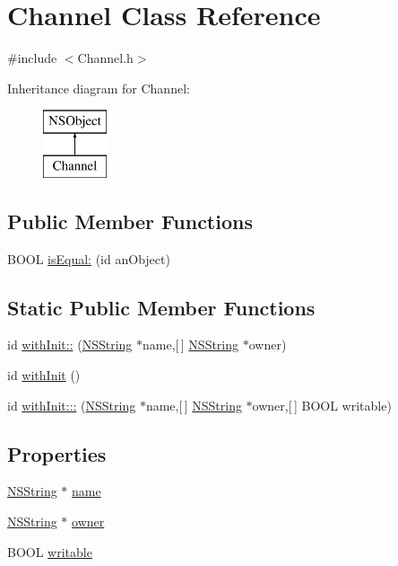 \hypertarget{interface_channel}{
\section{\-Channel \-Class \-Reference}
\label{interface_channel}
}


{\ttfamily \#include $<$\-Channel.\-h$>$}

\-Inheritance diagram for \-Channel\-:\begin{figure}[H]
\begin{center}
\leavevmode
\includegraphics[height=2.000000cm]{interface_channel}
\end{center}
\end{figure}
\subsection*{\-Public \-Member \-Functions}
\begin{DoxyCompactItemize}
\item 
\-B\-O\-O\-L \hyperlink{interface_channel_ad8953282a8deae8579e0f293429424e9}{is\-Equal\-:} (id an\-Object)
\end{DoxyCompactItemize}
\subsection*{\-Static \-Public \-Member \-Functions}
\begin{DoxyCompactItemize}
\item 
id \hyperlink{interface_channel_abe225600e78759a3765c5a5af891b4ca}{with\-Init\-::} (\hyperlink{class_n_s_string}{\-N\-S\-String} $\ast$name,\mbox{[}$\,$\mbox{]} \hyperlink{class_n_s_string}{\-N\-S\-String} $\ast$owner)
\item 
id \hyperlink{interface_channel_a0aab206e239acdec6d50bd8e328934ba}{with\-Init} ()
\item 
id \hyperlink{interface_channel_a8c36d05ce985b19155c3a873a0c1ba43}{with\-Init\-:::} (\hyperlink{class_n_s_string}{\-N\-S\-String} $\ast$name,\mbox{[}$\,$\mbox{]} \hyperlink{class_n_s_string}{\-N\-S\-String} $\ast$owner,\mbox{[}$\,$\mbox{]} \-B\-O\-O\-L writable)
\end{DoxyCompactItemize}
\subsection*{\-Properties}
\begin{DoxyCompactItemize}
\item 
\hyperlink{class_n_s_string}{\-N\-S\-String} $\ast$ \hyperlink{interface_channel_a10427d10e009025674146f604b6edb35}{name}
\item 
\hyperlink{class_n_s_string}{\-N\-S\-String} $\ast$ \hyperlink{interface_channel_a344fa676392163a5e19ef2e640b0d194}{owner}
\item 
\-B\-O\-O\-L \hyperlink{interface_channel_a02fc37595d44aa104f9d26c9e5786f74}{writable}
\end{DoxyCompactItemize}


